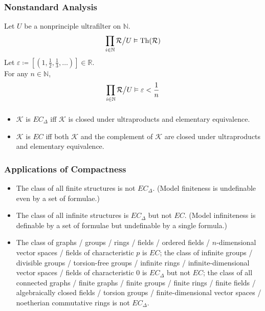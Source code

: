 \documentclass[UTF8,11pt,colorlinks,compress,openany]{beamer}%
\begin{document}
\begin{frame}\frametitle{Nonstandard Analysis}
Let $U$ be a nonprinciple ultrafilter on $\mathbb{N}$.
\[\prod\limits_{i\in\mathbb{N}}\mathcal{R}\big\slash U\vDash\operatorname{Th}(\mathcal{R})\]
Let $\varepsilon\coloneqq \left[(1,\frac{1}{2},\frac{1}{3},\dots)\right]\in\mathbb{R}$.\\
For any $n\in\mathbb{N}$,
\[\prod\limits_{i\in\mathbb{N}}\mathcal{R}\big\slash U\vDash\varepsilon<\frac{1}{n}\]
\end{frame}

\begin{frame}\frametitle{}
\begin{theorem}
\begin{itemize}
	\item $\mathcal{K}$ is $EC_\Delta$ iff $\mathcal{K}$ is closed under ultraproducts and elementary equivalence.
	\item $\mathcal{K}$ is $EC$ iff both $\mathcal{K}$ and the complement of $\mathcal{K}$ are closed under ultraproducts and elementary equivalence.
\end{itemize}
\end{theorem}
\end{frame}

\begin{frame}\frametitle{Applications of Compactness}
	\begin{itemize}
		\item The class of all finite structures is not $EC_\Delta$. (Model finiteness is undefinable even by a set of formulae.)
		\item The class of all infinite structures is $EC_\Delta$ but not $EC$. (Model infiniteness is definable by a set of formulae but undefinable by a single formula.)
		\item The class of graphs / groups / rings / fields / ordered fields / $n$-dimensional vector spaces / fields of characteristic $p$ is $EC$; the class of infinite groups / divisible groups / torsion-free groups / infinite rings / infinite-dimensional vector spaces / fields of characteristic $0$ is $EC_\Delta$ but not $EC$; the class of all connected graphs / finite graphs / finite groups / finite rings / finite fields / algebraically closed fields / torsion groups / finite-dimensional vector spaces / noetherian commutative rings is not $EC_\Delta$.
	\end{itemize}
\end{frame}
\end{document}
